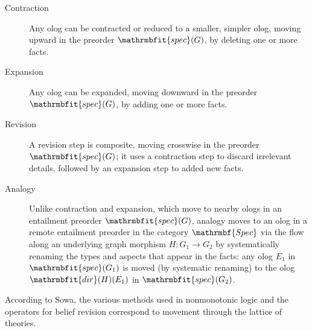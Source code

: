 \documentclass{amsart}
\theoremstyle{remark}
\theoremstyle{definition}
\begin{document}
\begin{description}
%
\item[Contraction] 
Any olog can be contracted or reduced to a smaller, simpler olog, 
moving upward in the preorder $\mathrmbfit{spec}(G)$, 
by deleting one or more facts.
%
\item[Expansion] 
Any olog can be expanded, 
moving downward in the preorder $\mathrmbfit{spec}(G)$, 
by adding one or more facts.
%
\item[Revision] 
A revision step is composite, 
moving crosswise in the preorder $\mathrmbfit{spec}(G)$;
it uses a contraction step to discard irrelevant details, 
followed by an expansion step to added new facts.
%
\item[Analogy] 
Unlike contraction and expansion, 
which move to nearby ologs in an entailment preorder $\mathrmbfit{spec}(G)$, 
analogy moves to an olog in a remote entailment preorder in the category $\mathrmbf{Spec}$
via the flow
along an underlying graph morphism  $H \colon G_{1} \rightarrow G_{2}$
by systematically renaming the types and aspects that appear in the facts:
any olog $E_{1}$ in $\mathrmbfit{spec}(G_{1})$
is moved (by systematic renaming) to the olog
$\mathrmbfit{dir}(H)(E_{1})$ in $\mathrmbfit{spec}(G_{2})$.
\end{description}
%
According to Sowa, 
the various methods used in nonmonotonic logic and the operators for belief revision 
correspond to movement through the lattice of theories.
\end{document}
